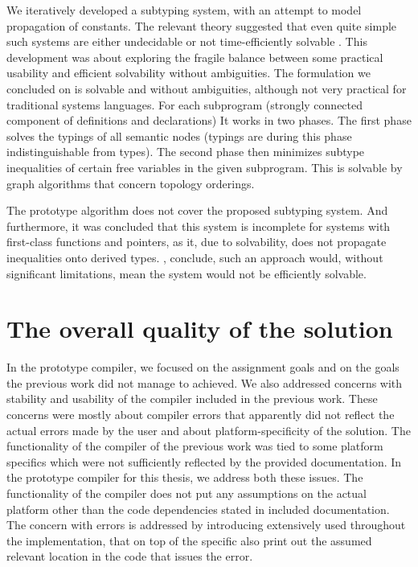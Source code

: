 \begin{description}
    \small
    \item[User-specifiable semantics of constants] We iteratively developed a subtyping system, with an attempt to model propagation of constants. The relevant theory suggested that even quite simple such systems are either undecidable or not time-efficiently solvable \cite{tiuryn1992subtype} \cite{frey1997subtype}. This development was about  exploring the fragile balance between some practical usability and efficient solvability without ambiguities. The formulation we concluded on is solvable and without ambiguities, although not very practical for traditional systems languages. For each subprogram (strongly connected component of definitions and declarations) It works in two phases. The first phase solves the typings of all semantic nodes (typings are during this phase indistinguishable from types). The second phase then minimizes subtype inequalities of certain free variables in the given subprogram. This is solvable by graph algorithms that concern topology orderings.

    The prototype algorithm does not cover the proposed subtyping system. And furthermore, it was concluded that this system is incomplete for systems with first-class functions and pointers, as it, due to solvability, does not propagate inequalities onto derived types. \citet{tiuryn1992subtype}, \citet{frey1997subtype} conclude, such an approach would, without significant limitations, mean the system would not be efficiently solvable.
\end{description}

\section*{The overall quality of the solution}

In the prototype compiler, we focused on the assignment goals and on the goals the previous work did not manage to achieved. We also addressed concerns with stability and usability of the compiler included in the previous work. These concerns were mostly about compiler errors that apparently did not reflect the actual errors made by the user and about platform-specificity of the solution. The functionality of the compiler of the previous work was tied to some platform specifics which were not sufficiently reflected by the provided documentation. In the prototype compiler for this thesis, we address both these issues. The functionality of the compiler does not put any assumptions on the actual platform other than the code dependencies stated in included documentation. The concern with errors is addressed by introducing  extensively used throughout the implementation, that on top of the specific also print out the assumed relevant location in the code that issues the error.


